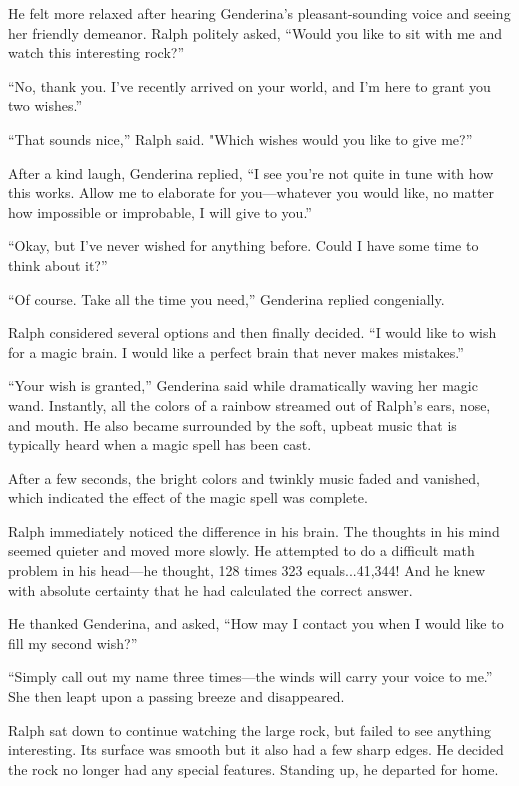 He felt more relaxed after hearing Genderina's pleasant-sounding voice and seeing her friendly demeanor. Ralph politely asked, “Would you like to sit with me and watch this interesting rock?”

“No, thank you. I've recently arrived on your world, and I'm here to grant you two wishes.”

“That sounds nice,” Ralph said. "Which wishes would you like to give me?”

After a kind laugh, Genderina replied, “I see you're not quite in tune with how this works. Allow me to elaborate for you—whatever you would like, no matter how impossible or improbable, I will give to you.”

“Okay, but I've never wished for anything before. Could I have some time to think about it?”

“Of course. Take all the time you need,” Genderina replied congenially.

Ralph considered several options and then finally decided. “I would like to wish for a magic brain. I would like a perfect brain that never makes mistakes.”

“Your wish is granted,” Genderina said while dramatically waving her magic wand. Instantly, all the colors of a rainbow streamed out of Ralph's ears, nose, and mouth. He also became surrounded by the soft, upbeat music that is typically heard when a magic spell has been cast.

After a few seconds, the bright colors and twinkly music faded and vanished, which indicated the effect of the magic spell was complete.

Ralph immediately noticed the difference in his brain. The thoughts in his mind seemed quieter and moved more slowly. He attempted to do a difficult math problem in his head—he thought, 128 times 323 equals...41,344! And he knew with absolute certainty that he had calculated the correct answer.

He thanked Genderina, and asked, “How may I contact you when I would like to fill my second wish?”

“Simply call out my name three times—the winds will carry your voice to me.” She then leapt upon a passing breeze and disappeared.

Ralph sat down to continue watching the large rock, but failed to see anything interesting. Its surface was smooth but it also had a few sharp edges. He decided the rock no longer had any special features. Standing up, he departed for home.

